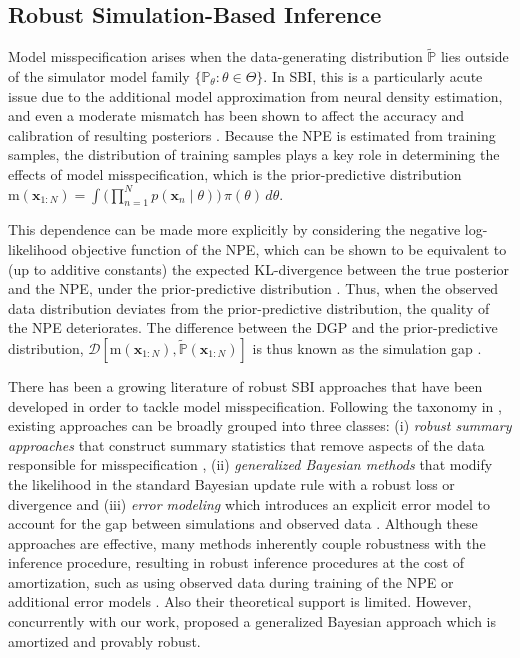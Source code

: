 \documentclass{article}
\theoremstyle{plain}
\theoremstyle{definition}
\theoremstyle{remark}
\begin{document}
\subsection{Robust Simulation-Based Inference}
\label{bg-rsbi}

Model misspecification arises when the data-generating distribution \( \tilde{\mathbb{P}} \) lies outside of the simulator model family \( \{ \mathbb{P}_\theta : \theta \in \Theta \} \). In SBI, this is a particularly acute issue due to the additional model approximation from neural density estimation, and even a moderate mismatch has been shown to affect the accuracy and calibration of resulting posteriors \citep{wardRobustNeuralPosterior2022a, cannonInvestigatingImpactModel2022a}.
Because the NPE is estimated from training samples, the distribution of training samples plays a key role in determining the effects of model misspecification, which is the prior-predictive distribution \( \mathrm{m}(\mathbf{x}_{1:N})=\int \Big(\prod_{n=1}^N p(\mathbf{x}_n\mid\theta)\Big)\,\pi(\theta)\,d\theta \).

This dependence can be made more explicitly by considering the negative log-likelihood objective function of the NPE, which can be shown to be equivalent to (up to additive constants) the expected KL-divergence between the true posterior and the NPE, under the prior-predictive distribution \citep{schmittDetectingModelMisspecification2024a}. Thus, when the observed data distribution deviates from the prior-predictive distribution, the quality of the NPE deteriorates. The difference between the DGP and the prior-predictive distribution, \( \mathcal{D}[\mathrm{m}(\mathbf{x}_{1:N}), \tilde{\mathbb{P}}(\mathbf{x}_{1:N})] \) is thus known as the simulation gap \citep{schmittDetectingModelMisspecification2024a}.

There has been a growing literature of robust SBI approaches that have been developed in order to tackle model misspecification. Following the taxonomy in \citet{kellySimulationbasedBayesianInference2025b}, existing approaches can be broadly grouped into three classes:
(i) \emph{robust summary approaches} that construct summary statistics that remove aspects of the data responsible for misspecification \citep{huangLearningRobustStatistics2023g},
(ii) \emph{generalized Bayesian methods} that modify the likelihood in the standard Bayesian update rule with a robust loss or divergence \citep{bissiriGeneralFrameworkUpdating2016a,dellaportaRobustBayesianInference2022b}
and
(iii) \emph{error modeling} which introduces an explicit error model to account for the gap between simulations and observed data \citep{ratmannModelCriticismBased2009,frazierRobustApproximateBayesian2021}. 
Although these approaches are effective, many methods inherently couple robustness with the inference procedure, resulting in robust inference procedures at the cost of amortization, such as using observed data during training of the NPE \citep{huangLearningRobustStatistics2023g, elsemullerDoesUnsupervisedDomain2025c} or additional error models \citep{wardRobustNeuralPosterior2022a, kelly2024misspecification}.
Also their theoretical support is limited.
However, concurrently with our work, \citet{bharti2026amortised} proposed a generalized Bayesian approach which is amortized and provably robust.
\end{document}
